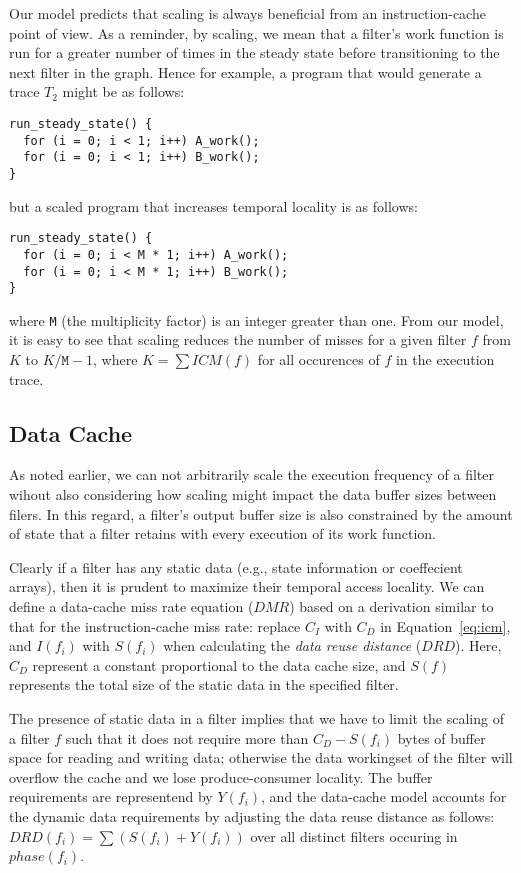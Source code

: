 Our model predicts that scaling is always beneficial from an
instruction-cache point of view. As a reminder, by scaling, we mean
that a filter's work function is run for a greater number of times in
the steady state before transitioning to the next filter in the
graph. Hence for example, a program that would generate a trace $T_2$
might be as follows:
\begin{verbatim}
run_steady_state() {
  for (i = 0; i < 1; i++) A_work();
  for (i = 0; i < 1; i++) B_work();
}
\end{verbatim}
but a scaled program that increases temporal locality is as follows:
\begin{verbatim}
run_steady_state() {
  for (i = 0; i < M * 1; i++) A_work();
  for (i = 0; i < M * 1; i++) B_work();
}
\end{verbatim}
where \texttt{M} (the multiplicity factor) is an integer greater than
one. From our model, it is easy to see that scaling reduces the number
of misses for a given filter $f$ from $K$ to $K/\texttt{M}- 1$, where $K =
\sum ICM(f)$ for all occurences of $f$ in  the execution trace.

\subsection{Data Cache}

As noted earlier, we can not arbitrarily scale the execution frequency
of a filter wihout also considering how scaling might impact
the data buffer sizes between filers. In this regard, a filter's
output buffer size is also constrained by the amount of state that a
filter retains with every execution of its work function.

Clearly if a filter has any static data (e.g., state information or
coeffecient arrays), then it is prudent to maximize their temporal
access locality. We can define a data-cache miss rate equation ($DMR$) based on
a derivation similar to that for the instruction-cache miss rate:
replace $C_I$ with $C_D$ in Equation~\ref{eq:icm}, and $I(f_i)$ with
$S(f_i)$ when calculating the {\it data reuse distance} ($DRD$). 
Here, $C_D$ represent a constant proportional to the data cache size,
and $S(f)$ represents the total size of the static data in the
specified filter.

The presence of static data in a filter implies that we have to limit
the scaling of a filter $f$ such that it does not require more than $C_D -
S(f_i)$ bytes of buffer space for reading and writing data; otherwise
the data workingset of the filter will overflow the cache and we lose
produce-consumer locality. The buffer requirements are representend by
$Y(f_i)$, and the data-cache model accounts for the dynamic data
requirements by adjusting the data reuse distance as follows:
$DRD(f_i) = \sum (S(f_i) + Y(f_i))$ over all distinct filters occuring
in $phase(f_i)$.

